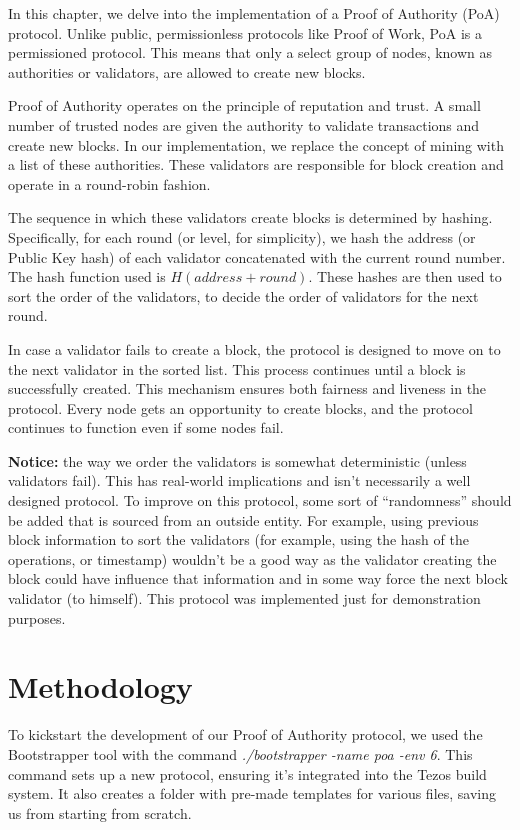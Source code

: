 In this chapter, we delve into the implementation of a Proof of Authority (PoA) protocol. Unlike public, permissionless protocols like Proof of Work, PoA is a permissioned protocol. This means that only a select group of nodes, known as authorities or validators, are allowed to create new blocks.

Proof of Authority operates on the principle of reputation and trust. A small number of trusted nodes are given the authority to validate transactions and create new blocks. In our implementation, we replace the concept of mining with a list of these authorities. These validators are responsible for block creation and operate in a round-robin fashion.

The sequence in which these validators create blocks is determined by hashing. Specifically, for each round (or level, for simplicity), we hash the address (or Public Key hash) of each validator concatenated with the current round number. The hash function used is $H(address + round)$. These hashes are then used to sort the order of the validators, to decide the order of validators for the next round.


In case a validator fails to create a block, the protocol is designed to move on to the next validator in the sorted list. This process continues until a block is successfully created. This mechanism ensures both fairness and liveness in the protocol. Every node gets an opportunity to create blocks, and the protocol continues to function even if some nodes fail.

\textbf{Notice:} the way we order the validators is somewhat deterministic (unless validators fail). This has real-world implications and isn't necessarily a well designed protocol. 
To improve on this protocol, some sort of ``randomness'' should be added that is sourced from an outside entity. For example, using previous block information to sort the validators (for example, using the hash of the operations, or timestamp) wouldn't be a good way as the validator creating the block could have influence that information and in some way force the next block validator (to himself). This protocol was implemented just for demonstration purposes.

\section{Methodology}

To kickstart the development of our Proof of Authority protocol, we used the Bootstrapper tool with the command \textit{./bootstrapper -name poa -env 6}. This command sets up a new protocol, ensuring it's integrated into the Tezos build system. It also creates a folder with pre-made templates for various files, saving us from starting from scratch.

